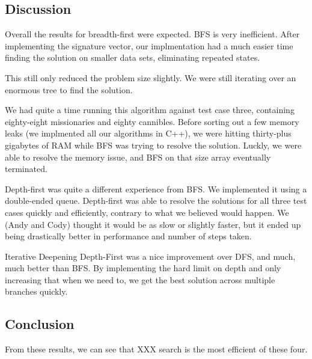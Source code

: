\documentclass[10pt,letterpaper]{article}
\begin{document}
  \subsection{Discussion}
  Overall the results for breadth-first were expected. BFS is very inefficient.
  After implementing the signature vector, our implmentation had a much easier
  time finding the solution on smaller data sets, eliminating repeated states.

  This still only reduced the problem size slightly. We were still iterating
  over an enormous tree to find the solution.

  We had quite a time running this algorithm against test case three, containing
  eighty-eight missionaries and eighty cannibles. Before sorting out a few memory
  leaks (we implmented all our algorithms in C++), we were hitting thirty-plus
  gigabytes of RAM while BFS was trying to resolve the solution. Luckly, we were
  able to resolve the memory issue, and BFS on that size array eventually
  terminated.

  Depth-first was quite a different experience from BFS. We implemented it using
  a double-ended queue. Depth-first was able to resolve the solutions for all three test cases quickly
  and efficiently, contrary to what we believed would happen. We (Andy and Cody)
  thought it would be as slow or slightly faster, but it ended up being drastically
  better in performance and number of steps taken.

  Iterative Deepening Depth-First was a nice improvement over DFS, and much, much
  better than BFS. By implementing the hard limit on depth and only increasing that
  when we need to, we get the best solution across multiple branches quickly.



  \subsection{Conclusion}
  From these results, we can see that XXX search is the most efficient of these four.
\end{document}
